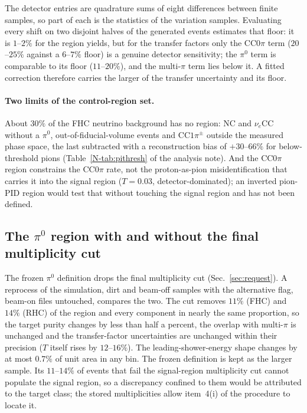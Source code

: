 \documentclass[11pt,a4paper]{article}
\newcommand{\noteref}[2]{#1~\ref{N-#2} of the analysis note}
\begin{document}
The detector entries are quadrature sums of eight differences between finite samples, so part of each is
the statistics of the variation samples. Evaluating every shift on two disjoint halves of the generated
events estimates that floor: it is $1$--$2\%$ for the region yields, but for the transfer factors only
the CC$0\pi$ term ($20$--$25\%$ against a $6$--$7\%$ floor) is a genuine detector sensitivity; the
$\pi^0$ term is comparable to its floor ($11$--$20\%$), and the multi-$\pi$ term lies below it. A fitted
correction therefore carries the larger of the transfer uncertainty and its floor.

\paragraph{Two limits of the control-region set.} About $30\%$ of the FHC neutrino background has no
region: NC and $\nu_e$CC without a $\pi^0$, out-of-fiducial-volume events and CC$1\pi^\pm$ outside the
measured phase space, the last subtracted with a reconstruction bias of $+30$--$66\%$ for below-threshold
pions (\noteref{Table}{tab:pithresh}). And the CC$0\pi$ region constrains the CC$0\pi$ rate, not the
proton-as-pion misidentification that carries it into the signal region ($T=0.03$, detector-dominated);
an inverted pion-PID region would test that without touching the signal region and has not been defined.

\subsection{The $\pi^0$ region with and without the final multiplicity cut}
\label{sec:cr_pi0_final}
The frozen $\pi^0$ definition drops the final multiplicity cut (Sec.~\ref{sec:request}). A reprocess of the
simulation, dirt and beam-off samples with the alternative flag, beam-on files untouched, compares the two.
The cut removes $11\%$ (FHC) and $14\%$ (RHC) of the region and every component in nearly the same
proportion, so the target purity changes by less than half a percent, the overlap with multi-$\pi$ is
unchanged and the transfer-factor uncertainties are unchanged within their precision ($T$ itself rises by
$12$--$16\%$). The leading-shower-energy shape changes by at most $0.7\%$ of unit area in any bin. The
frozen definition is kept as the larger sample. Its $11$--$14\%$ of events that fail the signal-region
multiplicity cut cannot populate the signal region, so a discrepancy confined to them would be attributed
to the target class; the stored multiplicities allow item~4(i) of the procedure to locate it.
\end{document}
